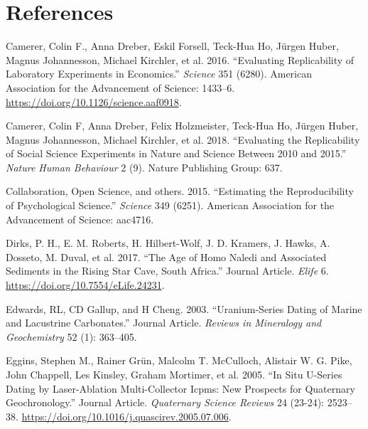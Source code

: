\documentclass[]{elsarticle} %
\begin{document}
\newpage

\nolinenumbers

\hypertarget{references}{%
\section*{References}\label{references}}

\hypertarget{refs}{}
\leavevmode\hypertarget{ref-Camerer1433}{}%
Camerer, Colin F., Anna Dreber, Eskil Forsell, Teck-Hua Ho, Jürgen Huber, Magnus Johannesson, Michael Kirchler, et al. 2016. ``Evaluating Replicability of Laboratory Experiments in Economics.'' \emph{Science} 351 (6280). American Association for the Advancement of Science: 1433--6. \url{https://doi.org/10.1126/science.aaf0918}.

\leavevmode\hypertarget{ref-camerer2018evaluating}{}%
Camerer, Colin F, Anna Dreber, Felix Holzmeister, Teck-Hua Ho, Jürgen Huber, Magnus Johannesson, Michael Kirchler, et al. 2018. ``Evaluating the Replicability of Social Science Experiments in Nature and Science Between 2010 and 2015.'' \emph{Nature Human Behaviour} 2 (9). Nature Publishing Group: 637.

\leavevmode\hypertarget{ref-open2015estimating}{}%
Collaboration, Open Science, and others. 2015. ``Estimating the Reproducibility of Psychological Science.'' \emph{Science} 349 (6251). American Association for the Advancement of Science: aac4716.

\leavevmode\hypertarget{ref-Dirks2017}{}%
Dirks, P. H., E. M. Roberts, H. Hilbert-Wolf, J. D. Kramers, J. Hawks, A. Dosseto, M. Duval, et al. 2017. ``The Age of Homo Naledi and Associated Sediments in the Rising Star Cave, South Africa.'' Journal Article. \emph{Elife} 6. \url{https://doi.org/10.7554/eLife.24231}.

\leavevmode\hypertarget{ref-RN4495}{}%
Edwards, RL, CD Gallup, and H Cheng. 2003. ``Uranium-Series Dating of Marine and Lacustrine Carbonates.'' Journal Article. \emph{Reviews in Mineralogy and Geochemistry} 52 (1): 363--405.

\leavevmode\hypertarget{ref-Eggins2005}{}%
Eggins, Stephen M., Rainer Grün, Malcolm T. McCulloch, Alistair W. G. Pike, John Chappell, Les Kinsley, Graham Mortimer, et al. 2005. ``In Situ U-Series Dating by Laser-Ablation Multi-Collector Icpms: New Prospects for Quaternary Geochronology.'' Journal Article. \emph{Quaternary Science Reviews} 24 (23-24): 2523--38. \url{https://doi.org/10.1016/j.quascirev.2005.07.006}.
\end{document}
